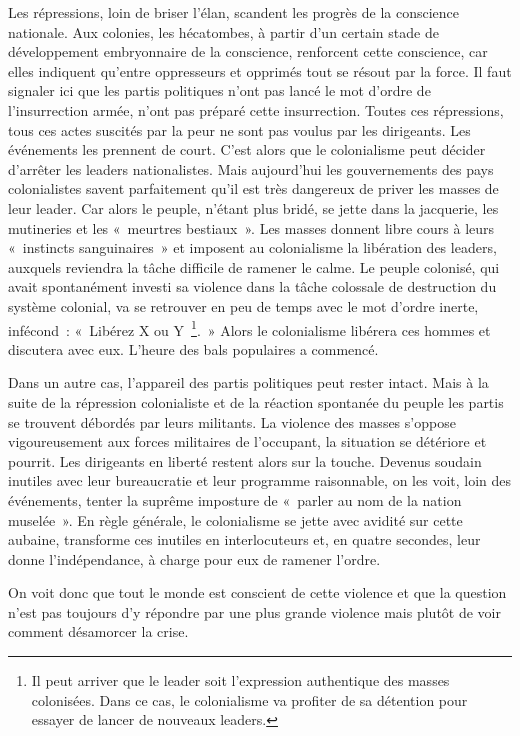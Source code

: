 \documentclass[french,twoside]{book} %
\begin{document}
\noindent Les répressions, loin de briser l’élan, scandent les progrès de la conscience nationale. Aux colonies, les hécatombes, à partir   d’un certain stade de développement embryonnaire de la conscience, renforcent cette conscience, car elles indiquent qu’entre oppresseurs et opprimés tout se résout par la force. Il faut signaler ici que les partis politiques n’ont pas lancé le mot d’ordre de l’insurrection armée, n’ont pas préparé cette insurrection. Toutes ces répressions, tous ces actes suscités par la peur ne sont pas voulus par les dirigeants. Les événements les prennent de court. C’est alors que le colonialisme peut décider d’arrêter les leaders nationalistes. Mais aujourd’hui les gouvernements des pays colonialistes savent parfaitement qu’il est très dangereux de priver les masses de leur leader. Car alors le peuple, n’étant plus bridé, se jette dans la jacquerie, les mutineries et les « meurtres bestiaux ». Les masses donnent libre cours à leurs « instincts sanguinaires » et imposent au colonialisme la libération des leaders, auxquels reviendra la tâche difficile de ramener le calme. Le peuple colonisé, qui avait spontanément investi sa violence dans la tâche colossale de destruction du système colonial, va se retrouver en peu de temps avec le mot d’ordre inerte, infécond : « Libérez X ou Y \footnote{Il peut arriver que le leader soit l’expression authentique des masses colonisées. Dans ce cas, le colonialisme va profiter de sa détention pour essayer de lancer de nouveaux leaders.}. » Alors le colonialisme libérera ces hommes et discutera avec eux. L’heure des bals populaires a commencé.\par
Dans un autre cas, l’appareil des partis politiques peut rester intact. Mais à la suite de la répression colonialiste et de la réaction spontanée du peuple les partis se trouvent débordés par leurs militants. La violence des masses s’oppose vigoureusement aux forces militaires de l’occupant, la situation se détériore et pourrit. Les dirigeants en liberté restent alors sur la touche. Devenus soudain inutiles avec leur bureaucratie et leur programme raisonnable, on les voit, loin des événements, tenter la suprême imposture de « parler au nom de la nation muselée ». En règle générale, le colonialisme se jette avec avidité sur cette aubaine, transforme ces inutiles en interlocuteurs et, en quatre   secondes, leur donne l’indépendance, à charge pour eux de ramener l’ordre.\par
On voit donc que tout le monde est conscient de cette violence et que la question n’est pas toujours d’y répondre par une plus grande violence mais plutôt de voir comment désamorcer la crise.\par
\end{document}
